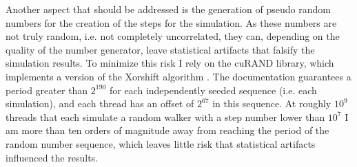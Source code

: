 Another aspect that should be addressed is the generation of pseudo random numbers for the creation of the steps for the simulation. As these numbers are not truly random, i.e. not completely uncorrelated, they can, depending on the quality of the number generator, leave statistical artifacts that falsify the simulation results. To minimize this risk I rely on the cuRAND library, which implements a version of the Xorshift algorithm \cite{marsaglia2003xorshift}. The documentation guarantees a period greater than $2^{190}$ for each independently seeded sequence (i.e. each simulation), and each thread has an offset of $2^{67}$ in this sequence. At roughly $10^{9}$ threads that each simulate a random walker with a step number lower than $10^{7}$ I am more than ten orders of magnitude away from reaching the period of the random number sequence, which leaves little risk that statistical artifacts influenced the results.
